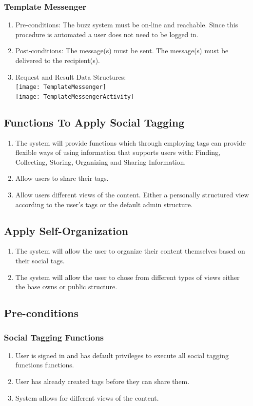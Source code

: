 \documentclass[12pt, oneside]{article}
\begin{document}
\subsubsection{Template Messenger}
\begin{enumerate}
\item Pre-conditions:   The buzz system must be on-line and reachable. Since this procedure is automated a user does not need to be logged in.
\item Post-conditions:  The message(s) must be sent. The message(s) must be delivered to the recipient(s).
\\
\item Request and Result Data Structures:\\
   \texttt{[image: TemplateMessenger]}\\
 \texttt{[image: TemplateMessengerActivity]} 
\end{enumerate}
\subsection{Functions To Apply Social Tagging}
\begin{enumerate}
\item The system will provide functions which through employing tags can provide flexible ways of using information that supports users with: Finding, Collecting, Storing, Organizing and Sharing Information.
\item Allow users to share their tags.
\item Allow users different views of the content. Either a personally structured view according to the user's tags or the default admin structure.
\end{enumerate}
\subsection{Apply Self-Organization}
\begin{enumerate}
\item The system will allow the user to organize their content themselves based on their social tags.
\item The system will allow the user to chose from different types of views either the base owns or public structure.
\end{enumerate}
\subsection{Pre-conditions}
\subsubsection{Social Tagging Functions}    
\begin{enumerate}
\item User is signed in and has default privileges to execute all social tagging functions functions.
\item User has already created tags before they can share them.
\item  System allows for different views of the content.
\end{enumerate}
\end{document}
